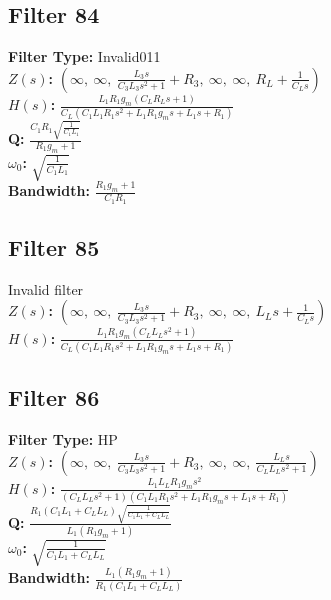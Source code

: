 \documentclass{article}
\begin{document}
\subsection*{Filter 84}
\textbf{Filter Type:} Invalid011 \\ 
\textbf{$Z(s)$:} $\left( \infty, \  \infty, \  \frac{L_{3} s}{C_{3} L_{3} s^{2} + 1} + R_{3}, \  \infty, \  \infty, \  R_{L} + \frac{1}{C_{L} s}\right)$ \\ 
\textbf{$H(s)$:} $\frac{L_{1} R_{1} g_{m} \left(C_{L} R_{L} s + 1\right)}{C_{L} \left(C_{1} L_{1} R_{1} s^{2} + L_{1} R_{1} g_{m} s + L_{1} s + R_{1}\right)}$ \\ 
\textbf{Q:} $\frac{C_{1} R_{1} \sqrt{\frac{1}{C_{1} L_{1}}}}{R_{1} g_{m} + 1}$ \\ 
\textbf{$\omega_0$:} $\sqrt{\frac{1}{C_{1} L_{1}}}$ \\ 
\textbf{Bandwidth:} $\frac{R_{1} g_{m} + 1}{C_{1} R_{1}}$ \\ 
\subsection*{Filter 85}
Invalid filter \\ 
\textbf{$Z(s)$:} $\left( \infty, \  \infty, \  \frac{L_{3} s}{C_{3} L_{3} s^{2} + 1} + R_{3}, \  \infty, \  \infty, \  L_{L} s + \frac{1}{C_{L} s}\right)$ \\ 
\textbf{$H(s)$:} $\frac{L_{1} R_{1} g_{m} \left(C_{L} L_{L} s^{2} + 1\right)}{C_{L} \left(C_{1} L_{1} R_{1} s^{2} + L_{1} R_{1} g_{m} s + L_{1} s + R_{1}\right)}$ \\ 
\subsection*{Filter 86}
\textbf{Filter Type:} HP \\ 
\textbf{$Z(s)$:} $\left( \infty, \  \infty, \  \frac{L_{3} s}{C_{3} L_{3} s^{2} + 1} + R_{3}, \  \infty, \  \infty, \  \frac{L_{L} s}{C_{L} L_{L} s^{2} + 1}\right)$ \\ 
\textbf{$H(s)$:} $\frac{L_{1} L_{L} R_{1} g_{m} s^{2}}{\left(C_{L} L_{L} s^{2} + 1\right) \left(C_{1} L_{1} R_{1} s^{2} + L_{1} R_{1} g_{m} s + L_{1} s + R_{1}\right)}$ \\ 
\textbf{Q:} $\frac{R_{1} \left(C_{1} L_{1} + C_{L} L_{L}\right) \sqrt{\frac{1}{C_{1} L_{1} + C_{L} L_{L}}}}{L_{1} \left(R_{1} g_{m} + 1\right)}$ \\ 
\textbf{$\omega_0$:} $\sqrt{\frac{1}{C_{1} L_{1} + C_{L} L_{L}}}$ \\ 
\textbf{Bandwidth:} $\frac{L_{1} \left(R_{1} g_{m} + 1\right)}{R_{1} \left(C_{1} L_{1} + C_{L} L_{L}\right)}$ \\ 
\end{document}
